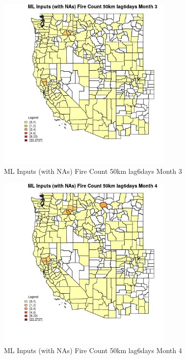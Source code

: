 \begin{figure} 
\centering  
\includegraphics[width=0.77\textwidth]{Code_Outputs/Report_ML_input_PM25_Step4_part_f_de_duplicated_aveswNAs_CountyFire_Count_50km_lag6daysmedianMonth3.jpg} 
\caption{\label{fig:Report_ML_input_PM25_Step4_part_f_de_duplicated_aveswNAsCountyFire_Count_50km_lag6daysmedianMonth3}ML Inputs (with NAs) Fire Count 50km lag6days Month 3} 
\end{figure} 
 

\begin{figure} 
\centering  
\includegraphics[width=0.77\textwidth]{Code_Outputs/Report_ML_input_PM25_Step4_part_f_de_duplicated_aveswNAs_CountyFire_Count_50km_lag6daysmedianMonth4.jpg} 
\caption{\label{fig:Report_ML_input_PM25_Step4_part_f_de_duplicated_aveswNAsCountyFire_Count_50km_lag6daysmedianMonth4}ML Inputs (with NAs) Fire Count 50km lag6days Month 4} 
\end{figure} 
 

